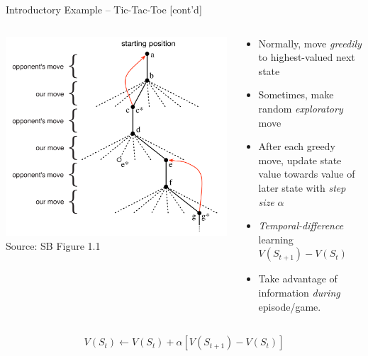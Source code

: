\documentclass[ignorenonframetext,xcolor=x11names]{beamer}
\begin{document}
\begin{frame}{Introductory Example -- Tic-Tac-Toe \small [cont'd]}
\begin{columns}
\begin{column}{0.5\textwidth}
\includegraphics[width=1.1\textwidth]{screen1.png} \\
\centering
\scriptsize Source: SB Figure 1.1
\end{column}
\begin{column}{0.5\textwidth}
\begin{itemize}
  \item Normally, move \emph{greedily} to highest-valued next state
  \item Sometimes, make random \emph{exploratory} move
  \item After each greedy move, update state value towards value of later state with \emph{step size} $\alpha$
  \item \emph{Temporal-difference} learning $V(S_{t+1}) - V(S_t)$
  \item Take advantage of information \emph{during} episode/game.
\end{itemize}
\end{column}
\end{columns}
  \begin{align*}
  V(S_t) \leftarrow V(S_t) + \alpha \left[ V(S_{t+1}) - V(S_t)\right] 
  \end{align*}
\end{frame}
\end{document}
